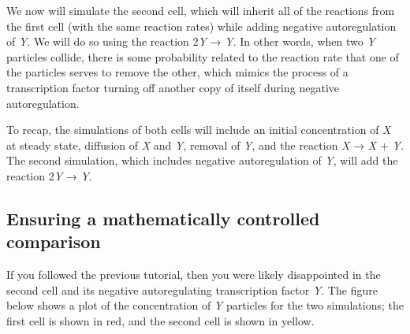 \begin{qbox}\end{qbox} 

We now will simulate the second cell, which will inherit all of the reactions from the first cell (with the same reaction rates) while adding negative autoregulation of \textit{Y}. We will do so using the reaction 2\textit{Y} → \textit{Y}. In other words, when two \textit{Y} particles collide, there is some probability related to the reaction rate that one of the particles serves to remove the other, which mimics the process of a transcription factor turning off another copy of itself during negative autoregulation.

To recap, the simulations of both cells will include an initial concentration of \textit{X} at steady state, diffusion of \textit{X} and \textit{Y}, removal of \textit{Y}, and the reaction \textit{X} → \textit{X} + \textit{Y}. The second simulation, which includes negative autoregulation of \textit{Y}, will add the reaction 2\textit{Y} → \textit{Y}. 

\begin{note}\end{note} 

\FloatBarrier
{}
\subsection{Ensuring a mathematically controlled comparison}

If you followed the previous tutorial, then you were likely disappointed in the second cell and its negative autoregulating transcription factor \textit{Y}. The figure below shows a plot of the concentration of \textit{Y} particles for the two simulations; the first cell is shown in red, and the second cell is shown in yellow.

